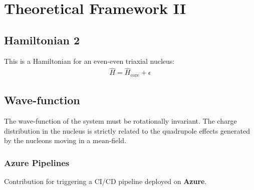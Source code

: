 \chapter{Theoretical Framework II}

\section{Hamiltonian 2}

This is a Hamiltonian for an even-even triaxial nucleus:
\begin{align}
    \hat{H}=\hat{H}_\text{core}+\epsilon
\end{align}

\lipsum[1-2]

\section{Wave-function}

The wave-function of the system must be rotationally invariant. The charge distribution in the nucleus is strictly related to the quadrupole effects generated by the nucleons moving in a mean-field.

\subsection{Azure Pipelines}

Contribution for triggering a CI/CD pipeline deployed on \textbf{Azure}.

\lipsum[1-2]